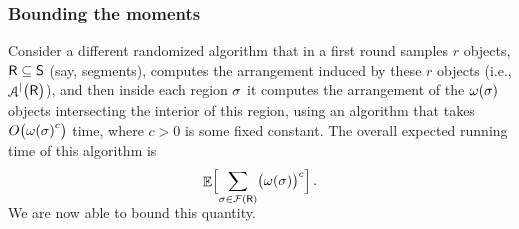 \raggedbottom

\subsubsection{Bounding the moments}

Consider a different randomized algorithm that in a first round
samples $r$ objects, $\mathsf{R} \subseteq \mathsf{S}$ (say, segments),
computes the arrangement induced by these $r$ objects (i.e.,
$\ArrVD{\bigl.\Sample}$), and then inside each region $\sigma$ it
computes the arrangement of the $\WeightX{\Trap}$ objects intersecting
the interior of this region, using an algorithm that takes
\begin{math}
    O\pth{\bigl. {\WeightX{\Trap}}^c }
\end{math}
time, where $c > 0$ is
some fixed constant. The overall expected running time of this
algorithm is
\begin{equation*}
    \Ex{\Bigl. \smash{ \sum_{\Trap \in \RegionsSet{\Sample}} \pth{
             \bigl. \WeightX[]{\Trap} }^c}}.
\end{equation*}
We are now able to bound this quantity.

